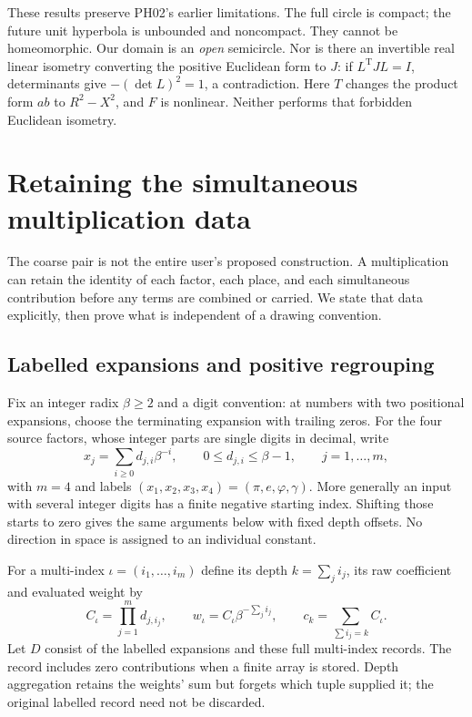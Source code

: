 \documentclass[11pt,a4paper]{article}
\newcommand{\tr}{\mathrm T}
\begin{document}
These results preserve PH02's earlier limitations. The full circle is compact; the future unit hyperbola is unbounded and noncompact. They cannot be homeomorphic. Our domain is an \emph{open} semicircle. Nor is there an invertible real linear isometry converting the positive Euclidean form to $J$: if $L^\tr J L=I$, determinants give $-(\det L)^2=1$, a contradiction. Here $T$ changes the product form $ab$ to $R^2-X^2$, and $F$ is nonlinear. Neither performs that forbidden Euclidean isometry.

\section{Retaining the simultaneous multiplication data}
\label{sec:digits}
The coarse pair is not the entire user's proposed construction. A multiplication can retain the identity of each factor, each place, and each simultaneous contribution before any terms are combined or carried. We state that data explicitly, then prove what is independent of a drawing convention.

\subsection{Labelled expansions and positive regrouping}
Fix an integer radix $\beta\ge2$ and a digit convention: at numbers with two positional expansions, choose the terminating expansion with trailing zeros. For the four source factors, whose integer parts are single digits in decimal, write
\begin{equation}
 x_j=\sum_{i\ge0}d_{j,i}\beta^{-i},\qquad 0\le d_{j,i}\le\beta-1,
 \qquad j=1,\ldots,m,
 \label{eq:expansions}
\end{equation}
with $m=4$ and labels $(x_1,x_2,x_3,x_4)=(\pi,e,\varphi,\gamma)$. More generally an input with several integer digits has a finite negative starting index. Shifting those starts to zero gives the same arguments below with fixed depth offsets. No direction in space is assigned to an individual constant.

For a multi-index $\iota=(i_1,\ldots,i_m)$ define its depth $k=\sum_j i_j$, its raw coefficient and evaluated weight by
\begin{equation}
 C_{\iota}=\prod_{j=1}^m d_{j,i_j},\qquad
 w_{\iota}=C_{\iota}\beta^{-\sum_j i_j},\qquad
 c_k=\sum_{\sum i_j=k}C_{\iota}.
 \label{eq:multi}
\end{equation}
Let $D$ consist of the labelled expansions and these full multi-index records. The record includes zero contributions when a finite array is stored. Depth aggregation retains the weights' sum but forgets which tuple supplied it; the original labelled record need not be discarded.
\end{document}
